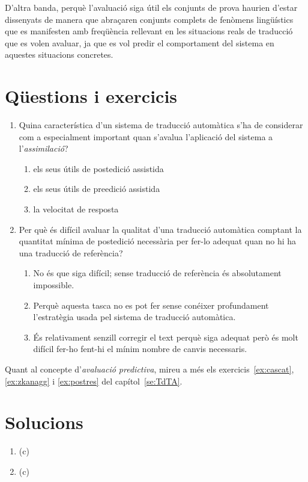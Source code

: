 D'altra banda, perquè l'avaluació siga útil els conjunts de prova
haurien d'estar dissenyats de manera que abraçaren conjunts complets
de fenòmens lingüístics que es manifesten amb freqüència rellevant en
les situacions reals de traducció que es volen avaluar, ja que es vol
predir el comportament del sistema en aquestes situacions concretes.


\section{Qüestions i exercicis}

\begin{enumerate}
\item Quina característica d'un sistema de traducció automàtica
   s'ha de considerar com a especialment important quan s'avalua
   l'aplicació del sistema a l'\emph{assimilació}?
   
\begin{enumerate}
\item els seus útils de postedició assistida
\item els seus útils de preedició assistida
\item la velocitat de resposta
\end{enumerate}

\item Per què és difícil avaluar la qualitat d'una traducció automàtica
   comptant la quantitat mínima de postedició necessària per fer-lo adequat
   quan no hi ha una traducció de referència?
   
\begin{enumerate}
\item No és que siga difícil; sense
      traducció de referència és absolutament impossible.
\item Perquè aquesta tasca no es pot fer sense conéixer
      profundament l'estratègia usada pel sistema de traducció
      automàtica.
\item És relativament senzill corregir el text perquè
      siga adequat però és molt difícil fer-ho fent-hi el mínim nombre
      de canvis necessaris.
\end{enumerate}


\end{enumerate}

Quant al concepte d'\emph{avaluació predictiva}, mireu a més els
exercicis~\ref{ex:cascat}, \ref{ex:zkanagg} i \ref{ex:postres} del capítol~\ref{se:TdTA}.


\section{Solucions}


\begin{enumerate}
\item (c)
\item (c)


\end{enumerate}



